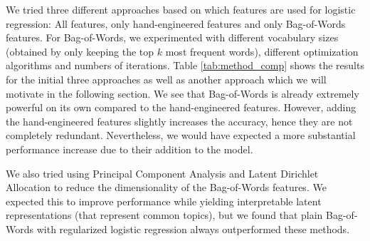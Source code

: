 \documentclass{article}
\begin{document}
\begin{table}[]
\caption{Comparison of the test set accuracies of the different methods.}
\label{tab:method_comp}
\end{table}

We tried three different approaches based on which features are used for logistic regression: All features, only hand-engineered features and only Bag-of-Words features. For Bag-of-Words, we experimented with different vocabulary sizes (obtained by only keeping the top $k$ most frequent words), different optimization algorithms and numbers of iterations. Table \ref{tab:method_comp} shows the results for the initial three approaches as well as another approach which we will motivate in the following section. We see that Bag-of-Words is already extremely powerful on its own compared to the hand-engineered features. However, adding the hand-engineered features slightly increases the accuracy, hence they are not completely redundant. Nevertheless, we would have expected a more substantial performance increase due to their addition to the model.

We also tried using Principal Component Analysis and Latent Dirichlet Allocation to reduce the dimensionality of the Bag-of-Words features. We expected this to improve performance while yielding interpretable latent representations (that represent common topics), but we found that plain Bag-of-Words with regularized logistic regression always outperformed these methods.
\end{document}
